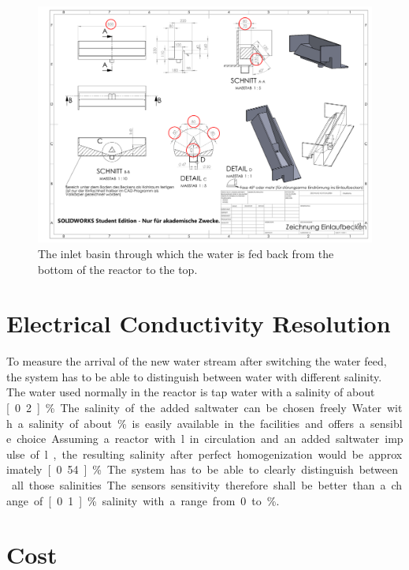 \begin{figure}
	\begin{center}
		\includegraphics[width=\textwidth]{images/Einlaufbecken.pdf} 
		\caption[The inlet basin.]{The inlet basin through which the water is fed back from the bottom of the reactor to the top.}
		\label{fig:elb}
	\end{center}
\end{figure}

\section{Electrical Conductivity Resolution}

To measure the arrival of the new water stream after switching the water feed, the system has to be able to distinguish between water with different salinity. The water used normally in the reactor is tap water with a salinity of about \unit[0.2]{\%}. The salinity of the added saltwater can be chosen freely. Water with a salinity of about \unit[5]{\%} is easily available in the facilities and offers a sensible choice. Assuming a reactor with \unit[65]{l} in circulation and an added saltwater impulse of \unit[5]{l}, the resulting salinity after perfect homogenization would be approximately \unit[0.54]{\%}. The system has to be able to clearly distinguish between all those salinities. The sensors sensitivity therefore shall be better than a change of \unit[0.1]{\%} salinity with a range from 0 to \unit[5]{\%}.

\section{Cost}


